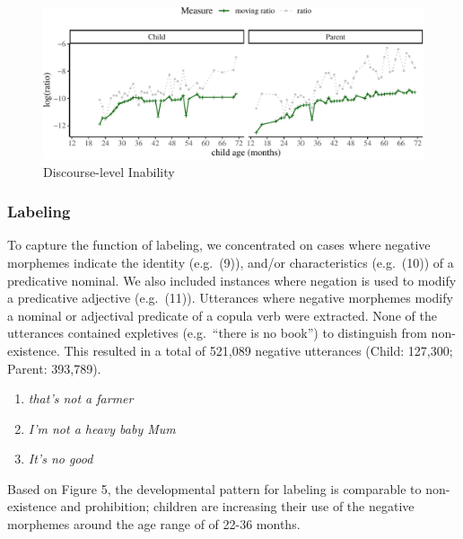 \documentclass[
  english,
  man,floatsintext]{apa6}
\providecommand{\tightlist}{%
  \setlength{\itemsep}{0pt}\setlength{\parskip}{0pt}}
\begin{document}
\begin{figure}[H]

{\centering \includegraphics{neg_construction_article_files/figure-latex/inabilitydiscourse-1} 

}

\caption{Discourse-level Inability}\label{fig:inabilitydiscourse}
\end{figure}

\clearpage

\hypertarget{labeling}{%
\subsubsection{Labeling}\label{labeling}}

To capture the function of labeling, we concentrated on cases where negative morphemes indicate the identity (e.g.~(9)), and/or characteristics (e.g.~(10)) of a predicative nominal. We also included instances where negation is used to modify a predicative adjective (e.g.~(11)). Utterances where negative morphemes modify a nominal or adjectival predicate of a copula verb were extracted. None of the utterances contained expletives (e.g.~``there is no book'') to distinguish from non-existence. This resulted in a total of 521,089 negative utterances (Child: 127,300; Parent: 393,789).

\begin{enumerate}
\def\labelenumi{(\arabic{enumi})}
\setcounter{enumi}{8}
\tightlist
\item
  \emph{that's not a farmer}
\item
  \emph{I'm not a heavy baby Mum}
\item
  \emph{It's no good}
\end{enumerate}

Based on Figure 5, the developmental pattern for labeling is comparable to non-existence and prohibition; children are increasing their use of the negative morphemes around the age range of of 22-36 months.
\end{document}
